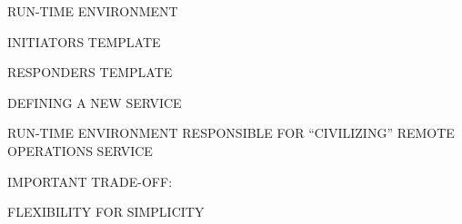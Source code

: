 
\begin{bwslide}
\bf

\begin{nrtc}
\item	RUN-TIME ENVIRONMENT

\item	INITIATORS TEMPLATE

\item	RESPONDERS TEMPLATE

\item	DEFINING A NEW SERVICE
\end{nrtc}
\end{bwslide}






\begin{bwslide}

\begin{nrtc}
\item	RUN-TIME ENVIRONMENT RESPONSIBLE FOR ``CIVILIZING'' REMOTE OPERATIONS
	SERVICE

\item	IMPORTANT TRADE-OFF:
    \begin{nrtc}
    \item	FLEXIBILITY FOR SIMPLICITY
    \end{nrtc}

\end{nrtc}
\end{bwslide}


